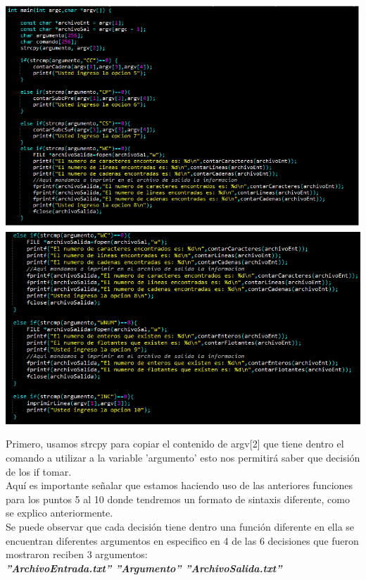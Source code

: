 \documentclass[12pt,letterpaper]{report}
\begin{document}
\begin{multicols}{2}
\includegraphics[scale=0.40]{codigo1}\\
\includegraphics[scale=0.40]{codigo2}
\end{multicols}

Primero, usamos strcpy para copiar el contenido de argv[2] que tiene dentro el comando a utilizar a la variable 'argumento' esto nos permitirá saber que decisión de los if tomar.\\
Aquí es importante señalar que estamos haciendo uso de las anteriores funciones para los puntos 5 al 10 donde tendremos un formato de sintaxis diferente, como se explico anteriormente.\\
Se puede observar que cada decisión tiene dentro una función diferente en ella se encuentran diferentes argumentos en especifico en 4 de las 6 decisiones que fueron mostraron reciben 3 argumentos: \\

\textbf{\textit{ ''ArchivoEntrada.txt''  ''Argumento'' ''ArchivoSalida.txt''}} \\
\end{document}
